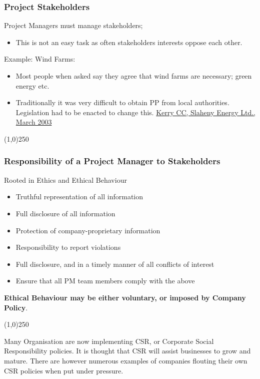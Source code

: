\begin{frame}
\frametitle{Project Stakeholders}
Project Managers must manage stakeholders; \\
\begin{itemize}
	\item This is not an easy task as often stakeholders interests oppose each other.
\end{itemize}
Example: Wind Farms:\\
	\begin{itemize}
		\item Most people when asked say they agree that wind farms are necessary; green energy etc.
		\item Traditionally it was very difficult to obtain PP from local authorities. Legislation had to be enacted to change this. \href{http://www1.pleanala.ie/REP/200/R200723.DOC}{Kerry CC, Slaheny Energy Ltd., March 2003}
	\end{itemize}

\end{frame}
\begin{center}\line(1,0){250}\end{center}



\begin{frame}
\frametitle{Responsibility of a Project Manager to Stakeholders}
Rooted in Ethics and Ethical Behaviour\\
\begin{itemize}
\item Truthful representation of all information
\item Full disclosure of all information
\item Protection of company-proprietary information
\item Responsibility to report violations
\item Full disclosure, and in a timely manner of all conflicts of interest
\item Ensure that all PM team members comply with the above
\end{itemize}
\textbf{Ethical Behaviour may be either voluntary, or imposed by Company Policy}.\\
\end{frame}
\begin{center}\line(1,0){250}\end{center}
Many Organisation are now implementing CSR, or Corporate Social Responsibility policies.  It is thought that CSR will assist businesses to grow and mature.  There are however numerous examples of companies flouting their own CSR policies when put under pressure.




